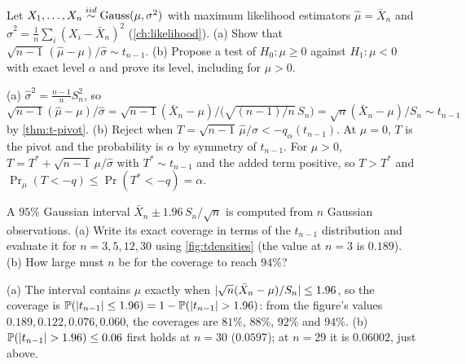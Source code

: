 \begin{exercise}
\label{ex:t-mle-pivot}
Let $X_1, \ldots, X_n \stackrel{iid}{\sim} \text{Gauss}(\mu, \sigma^2)$ with maximum likelihood estimators $\hat{\mu} = \bar{X}_n$ and $\hat{\sigma}^2 = \frac1n\sum_i(X_i - \bar{X}_n)^2$ (\cref{ch:likelihood}). (a) Show that $\sqrt{n-1}\,(\hat{\mu} - \mu)/\hat{\sigma} \sim t_{n-1}$. (b) Propose a test of $H_0: \mu \geq 0$ against $H_1: \mu < 0$ with exact level $\alpha$ and prove its level, including for $\mu > 0$.
\end{exercise}
\begin{solution}
(a) $\hat{\sigma}^2 = \frac{n-1}{n}S_n^2$, so $\sqrt{n-1}(\hat{\mu} - \mu)/\hat{\sigma} = \sqrt{n-1}(\bar{X}_n - \mu)/\big(\sqrt{(n-1)/n}\,S_n\big) = \sqrt{n}(\bar{X}_n - \mu)/S_n \sim t_{n-1}$ by \cref{thm:t-pivot}. (b) Reject when $T = \sqrt{n-1}\,\hat{\mu}/\hat{\sigma} < -q_\alpha(t_{n-1})$. At $\mu = 0$, $T$ is the pivot and the probability is $\alpha$ by symmetry of $t_{n-1}$. For $\mu > 0$, $T = T^* + \sqrt{n-1}\,\mu/\hat{\sigma}$ with $T^* \sim t_{n-1}$ and the added term positive, so $T > T^*$ and $\Pr_\mu(T < -q) \leq \Pr(T^* < -q) = \alpha$.
\end{solution}

\begin{exercise}
\label{ex:t-coverage}
A $95\%$ Gaussian interval $\bar{X}_n \pm 1.96\,S_n/\sqrt{n}$ is computed from $n$ Gaussian observations. (a) Write its exact coverage in terms of the $t_{n-1}$ distribution and evaluate it for $n = 3, 5, 12, 30$ using \cref{fig:tdensities} (the value at $n = 3$ is $0.189$). (b) How large must $n$ be for the coverage to reach $94\%$?
\end{exercise}
\begin{solution}
(a) The interval contains $\mu$ exactly when $\lvert\sqrt{n}(\bar{X}_n - \mu)/S_n\rvert \leq 1.96$, so the coverage is $\mathbb{P}(\lvert t_{n-1}\rvert \leq 1.96) = 1 - \mathbb{P}(\lvert t_{n-1}\rvert > 1.96)$: from the figure's values $0.189, 0.122, 0.076, 0.060$, the coverages are $81\%$, $88\%$, $92\%$ and $94\%$. (b) $\mathbb{P}(\lvert t_{n-1}\rvert > 1.96) \leq 0.06$ first holds at $n = 30$ ($0.0597$); at $n = 29$ it is $0.06002$, just above.
\end{solution}

